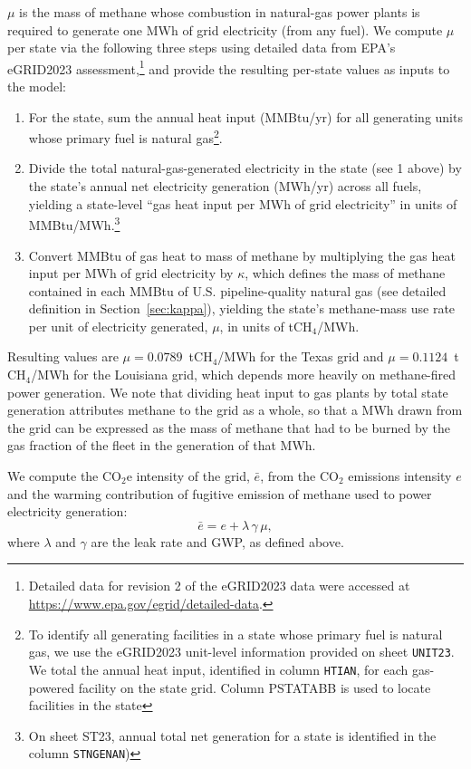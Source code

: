 \documentclass[11pt]{article}
\newcommand{\cotwo}{\ensuremath{\mathrm{CO_2}}}
\newcommand{\cotwoe}{\ensuremath{\mathrm{CO_{2}e}}}
\newcommand{\chfour}{\ensuremath{\mathrm{CH_4}}}
\begin{document}
$\mu$ is the mass of methane whose combustion in natural-gas power plants is required to generate one MWh of grid electricity (from any fuel). We compute $\mu$ per state via the following three steps using detailed data from EPA's eGRID2023 assessment,\footnote{Detailed data for revision 2 of the eGRID2023 data were accessed at \url{https://www.epa.gov/egrid/detailed-data}.} and provide the resulting per-state values as inputs to the model:
%
\begin{enumerate}
  \item For the state, sum the annual heat input (MMBtu/yr) for all generating units whose primary fuel is natural gas\footnote{To identify all generating facilities in a state whose primary fuel is natural gas, we use the eGRID2023 unit-level information provided on sheet \texttt{UNIT23}. We total the annual heat input, identified in column \texttt{HTIAN}, for each gas-powered facility on the state grid. Column PSTATABB is used to locate facilities in the state}.
  \item Divide the total natural-gas-generated electricity in the state (see 1 above) by the state's annual net electricity generation (MWh/yr) across all fuels, yielding a state-level ``gas heat input per MWh of grid electricity'' in units of MMBtu/MWh.\footnote{On sheet ST23, annual total net generation for a state is identified in the column \texttt{STNGENAN})}
  \item Convert MMBtu of gas heat to mass of methane by multiplying the gas heat input per MWh of grid electricity by $\kappa$, which defines the mass of methane contained in each MMBtu of U.S. pipeline-quality natural gas (see detailed definition in Section~\ref{sec:kappa}), yielding the state's methane-mass use rate per unit of electricity generated, $\mu$, in units of t\chfour{}/MWh.
\end{enumerate}
%
Resulting values are $\mu = 0.0789$~t\chfour{}/MWh for the Texas grid and $\mu = 0.1124$~t\chfour{}/MWh for the Louisiana grid, which depends more heavily on methane-fired power generation. We note that dividing heat input to gas plants by total state generation attributes methane to the grid as a whole, so that a MWh drawn from the grid can be expressed as the mass of methane that had to be burned by the gas fraction of the fleet in the generation of that MWh.

We compute the \cotwoe{} intensity of the grid, $\bar{e}$, from the \cotwo{} emissions intensity $e$ and the warming contribution of fugitive emission of methane used to power electricity generation:
%
\begin{equation}
  \bar{e} = e + \lambda\,\gamma\,\mu,
  \label{eq:grid_co2e}
\end{equation}
%
where $\lambda$ and $\gamma$ are the leak rate and GWP, as defined above.
\end{document}

